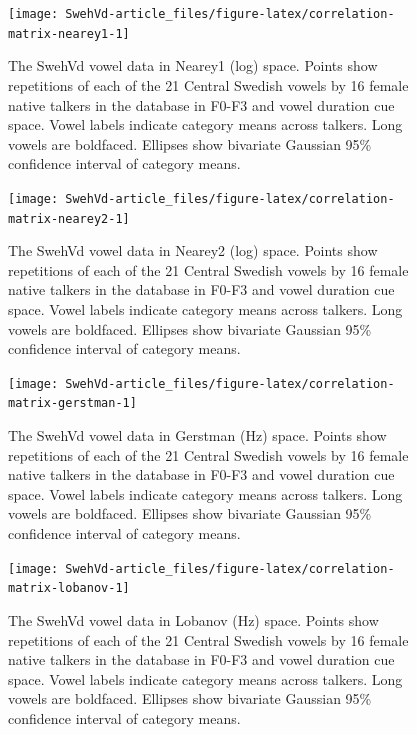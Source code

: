 \documentclass[utf8]{frontiersSCNS}
\begin{document}
\begin{figure}
\texttt{[image: SwehVd-article\_files/figure-latex/correlation-matrix-nearey1-1]} \caption{The SwehVd vowel data in Nearey1 (log) space. Points show repetitions of each of the 21 Central Swedish vowels by 16 female native talkers in the database in F0-F3 and vowel duration cue space. Vowel labels indicate category means across talkers. Long vowels are boldfaced. Ellipses show bivariate Gaussian 95\% confidence interval of category means.}\label{fig:correlation-matrix-nearey1}
\end{figure}



\begin{figure}
\texttt{[image: SwehVd-article\_files/figure-latex/correlation-matrix-nearey2-1]} \caption{The SwehVd vowel data in Nearey2 (log) space. Points show repetitions of each of the 21 Central Swedish vowels by 16 female native talkers in the database in F0-F3 and vowel duration cue space. Vowel labels indicate category means across talkers. Long vowels are boldfaced. Ellipses show bivariate Gaussian 95\% confidence interval of category means.}\label{fig:correlation-matrix-nearey2}
\end{figure}



\begin{figure}
\texttt{[image: SwehVd-article\_files/figure-latex/correlation-matrix-gerstman-1]} \caption{The SwehVd vowel data in Gerstman (Hz) space. Points show repetitions of each of the 21 Central Swedish vowels by 16 female native talkers in the database in F0-F3 and vowel duration cue space. Vowel labels indicate category means across talkers. Long vowels are boldfaced. Ellipses show bivariate Gaussian 95\% confidence interval of category means.}\label{fig:correlation-matrix-gerstman}
\end{figure}



\begin{figure}
\texttt{[image: SwehVd-article\_files/figure-latex/correlation-matrix-lobanov-1]} \caption{The SwehVd vowel data in Lobanov (Hz) space. Points show repetitions of each of the 21 Central Swedish vowels by 16 female native talkers in the database in F0-F3 and vowel duration cue space. Vowel labels indicate category means across talkers. Long vowels are boldfaced. Ellipses show bivariate Gaussian 95\% confidence interval of category means.}\label{fig:correlation-matrix-lobanov}
\end{figure}
\end{document}
